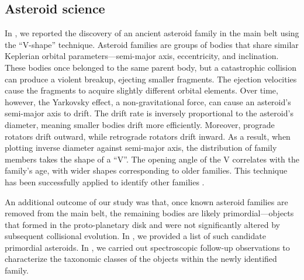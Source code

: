     \subsection*{Asteroid science}

        In \citet{2023A&A...676A...5F}, we reported the discovery of an ancient asteroid family in the main belt using the ``V-shape'' technique. Asteroid families are groups of bodies that share similar Keplerian orbital parameters—semi-major axis, eccentricity, and inclination. These bodies once belonged to the same parent body, but a catastrophic collision can produce a violent breakup, ejecting smaller fragments. The ejection velocities cause the fragments to acquire slightly different orbital elements. Over time, however, the Yarkovsky effect, a non-gravitational force, can cause an asteroid's semi-major axis to drift. The drift rate is inversely proportional to the asteroid's diameter, meaning smaller bodies drift more efficiently. Moreover, prograde rotators drift outward, while retrograde rotators drift inward. As a result, when plotting inverse diameter against semi-major axis, the distribution of family members takes the shape of a ``V''. The opening angle of the V correlates with the family's age, with wider shapes corresponding to older families. This technique has been successfully applied to identify other families \citep{2019A&A...624A..69D,2017Sci...357.1026D}.  

        An additional outcome of our study was that, once known asteroid families are removed from the main belt, the remaining bodies are likely primordial—objects that formed in the proto-planetary disk and were not significantly altered by subsequent collisional evolution. In \citet{2023A&A...676A...5F}, we provided a list of such candidate primordial asteroids. In \citet{2024A&A...682A..64B}, we carried out spectroscopic follow-up observations to characterize the taxonomic classes of the objects within the newly identified family.
